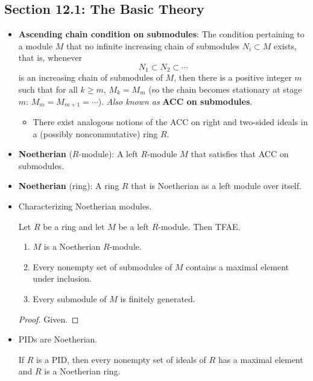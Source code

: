\documentclass[../notes.tex]{subfiles}
\begin{document}
\subsection*{Section 12.1: The Basic Theory}
\begin{itemize}
    \item \textbf{Ascending chain condition on submodules}: The condition pertaining to a module $M$ that no infinite increasing chain of submodules $N_i\subset M$ exists, that is, whenever
    \begin{equation*}
        N_1 \subset N_2 \subset \cdots
    \end{equation*}
    is an increasing chain of submodules of $M$, then there is a positive integer $m$ such that for all $k\geq m$, $M_k=M_m$ (so the chain becomes stationary at stage $m$: $M_m=M_{m+1}=\cdots$). \emph{Also known as} \textbf{ACC on submodules}.
    \begin{itemize}
        \item There exist analogous notions of the ACC on right and two-sided ideals in a (possibly noncommutative) ring $R$.
    \end{itemize}
    \item \textbf{Noetherian} ($R$-module): A left $R$-module $M$ that satisfies that ACC on submodules.
    \item \textbf{Noetherian} (ring): A ring $R$ that is Noetherian as a left module over itself.
    \item Characterizing Noetherian modules.
    \begin{theorem}\label{trm:12.1}
        Let $R$ be a ring and let $M$ be a left $R$-module. Then TFAE.
        \begin{enumerate}
            \item $M$ is a Noetherian $R$-module.
            \item Every nonempty set of submodules of $M$ contains a maximal element under inclusion.
            \item Every submodule of $M$ is finitely generated.
        \end{enumerate}
        \begin{proof}
            Given.
        \end{proof}
    \end{theorem}
    \item PIDs are Noetherian.
    \begin{corollary}\label{cly:12.2}
        If $R$ is a PID, then every nonempty set of ideals of $R$ has a maximal element and $R$ is a Noetherian ring.

\end{corollary}
\end{itemize}
\end{document}

